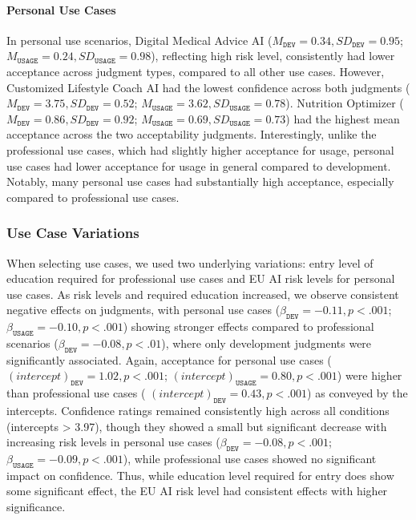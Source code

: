 
\paragraph{Personal Use Cases}
In personal use scenarios, Digital Medical Advice AI ($M_{\texttt{DEV}}=0.34, SD_{\texttt{DEV}}=0.95$; $M_{\texttt{USAGE}}=0.24, SD_{\texttt{USAGE}}=0.98$), reflecting high risk level, consistently had lower acceptance across judgment types, compared to all other use cases. However, Customized Lifestyle Coach AI had the lowest confidence across both judgments ($M_{\texttt{DEV}}=3.75, SD_{\texttt{DEV}}=0.52$; $M_{\texttt{USAGE}}=3.62, SD_{\texttt{USAGE}}=0.78$). Nutrition Optimizer ($M_{\texttt{DEV}}=0.86, SD_{\texttt{DEV}}=0.92$; $M_{\texttt{USAGE}}=0.69, SD_{\texttt{USAGE}}=0.73$) had the highest mean acceptance across the two acceptability judgments. Interestingly, unlike the professional use cases, which had slightly higher acceptance for usage, personal use cases had lower acceptance for usage in general compared to development. Notably, many personal use cases had substantially high acceptance, especially compared to professional use cases. 


\subsubsection{Use Case Variations}
When selecting use cases, we used two underlying variations: entry level of education required for professional use cases and EU AI risk levels for personal use cases. As risk levels and required education increased, we observe consistent negative effects on judgments, with personal use cases ($\beta_{\texttt{DEV}} = -0.11, p<.001$; $\beta_{\texttt{USAGE}} = -0.10, p < .001$) showing stronger effects compared to professional scenarios ($\beta_{\texttt{DEV}} = -0.08, p<.01$), where only development judgments were significantly associated. Again, acceptance for personal use cases ($(intercept)_{\texttt{DEV}}=1.02, p<.001$; $(intercept)_{\texttt{USAGE}}=0.80, p<.001$) were higher than professional use cases ( $(intercept)_{\texttt{DEV}}=0.43, p<.001$) as conveyed by the intercepts. Confidence ratings remained consistently high across all conditions (intercepts > 3.97), though they showed a small but significant decrease with increasing risk levels in personal use cases ($\beta_{\texttt{DEV}} = -0.08, p<.001$; $\beta_{\texttt{USAGE}} = -0.09, p<.001$), while professional use cases showed no significant impact on confidence. Thus, while education level required for entry does show some significant effect, the EU AI risk level had consistent effects with higher significance. 


